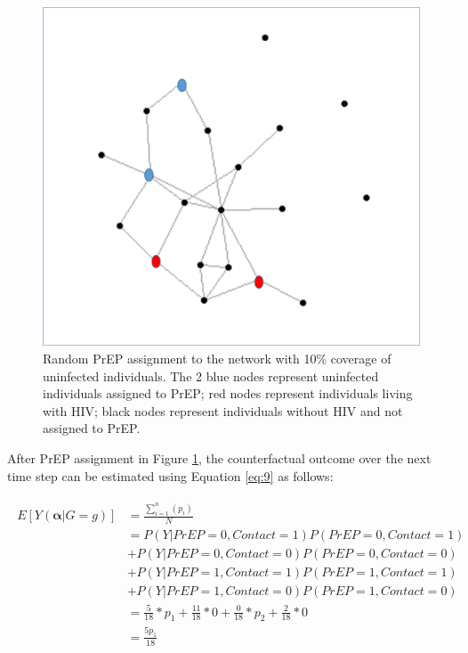 \documentclass{article}
\theoremstyle{definition}
\begin{document}
\begin{figure}[H]
    \centering
    \includegraphics[scale=0.5]{Original Figures/Network Example 2.png}
    \caption{Random PrEP assignment to the network with 10\% coverage of uninfected individuals. The 2 blue nodes represent uninfected individuals assigned to PrEP; red nodes represent individuals living with HIV; black nodes represent individuals without HIV and not assigned to PrEP.}
    \label{fig: Figure 3}
\end{figure}

After PrEP assignment in Figure \ref{fig: Figure 3}, the counterfactual outcome over the next time step can be estimated using Equation \ref{eq:9} as follows:

\begin{align}
\begin{split}
E[Y\left(\mathbf{\alpha}|G=g\right)] & = \frac{\sum_{i=1}^{n}(p_{i})}{N}  \\ 
& = P\left(Y|PrEP = 0, Contact = 1\right)P\left(PrEP = 0, Contact = 1\right)  \\ \nonumber
& +P\left(Y|PrEP = 0, Contact = 0\right)P\left(PrEP = 0, Contact = 0\right)  \\ \nonumber
& +P\left(Y|PrEP = 1, Contact = 1\right)P\left(PrEP = 1, Contact = 1\right) \\ \nonumber
&  +P\left(Y|PrEP = 1, Contact = 0\right)P\left(PrEP = 1, Contact = 0\right) \\ \nonumber
 &=  \frac{5}{18}*p_1 +  \frac{11}{18}*0 +\frac{0}{18}*p_2 +  \frac{2}{18}*0 \\ \nonumber
 &=\frac{5p_1}{18}  \nonumber
\end{split}
\end{align}
\end{document}
